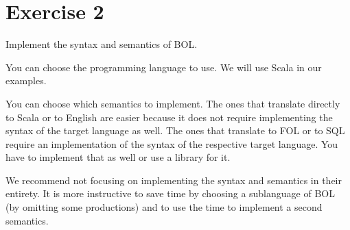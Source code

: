 \section{Exercise 2}

Implement the syntax and semantics of BOL.

You can choose the programming language to use. We will use Scala in our examples.

You can choose which semantics to implement.
The ones that translate directly to Scala or to English are easier because it does not require implementing the syntax of the target language as well.
The ones that translate to FOL or to SQL require an implementation of the syntax of the respective target language.
You have to implement that as well or use a library for it.

We recommend not focusing on implementing the syntax and semantics in their entirety.
It is more instructive to save time by choosing a sublanguage of BOL (by omitting some productions) and to use the time to implement a second semantics.
